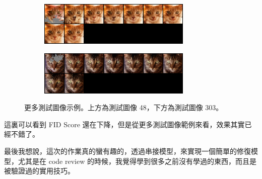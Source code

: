 \begin{figure}[h]
    \centering
    \begin{subfigure}{\textwidth}
        \centering
        \includegraphics[width=0.8\textwidth]{figures/test_48.png}
        \label{fig:test_48}
    \end{subfigure}
    \vspace{1cm}
    \begin{subfigure}{\textwidth}
        \centering
        \includegraphics[width=0.8\textwidth]{figures/test_303.png}
        \label{fig:test_303}
    \end{subfigure}
    \caption{更多測試圖像示例。上方為測試圖像 48，下方為測試圖像 303。}
    \label{fig:test_examples}
\end{figure}


這裏可以看到 FID Score 還在下降，但是從更多測試圖像範例來看，效果其實已經不錯了。

最後我想說，這次的作業真的蠻有趣的，透過串接模型，來實現一個簡單的修復模型，尤其是在 code review 的時候，我覺得學到很多之前沒有學過的東西，而且是被驗證過的實用技巧。




